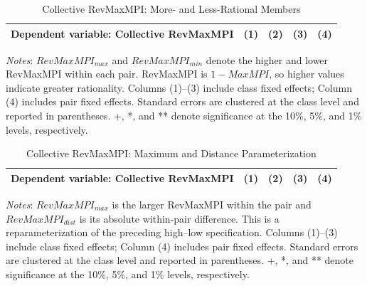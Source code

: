 \documentclass[11 pt]{article}
\begin{document}
\begin{table}[H]
\centering
\caption{Collective RevMaxMPI: More- and Less-Rational Members}
\label{tab:collective_maxmpi_highlow}
\begin{tabular}{lcccc}
\toprule \hline
Dependent variable: Collective RevMaxMPI & (1) & (2) & (3) & (4) \\
\midrule

\end{tabular}
\begin{minipage}{\textwidth}
{\footnotesize \emph{Notes}: $RevMaxMPI_{max}$ and $RevMaxMPI_{min}$ denote the higher and lower RevMaxMPI within each pair. RevMaxMPI is $1-MaxMPI$, so higher values indicate greater rationality. Columns (1)--(3) include class fixed effects; Column (4) includes pair fixed effects. Standard errors are clustered at the class level and reported in parentheses. +, *, and ** denote significance at the 10\%, 5\%, and 1\% levels, respectively.}
\end{minipage}
\end{table}

\begin{table}[H]
\centering
\caption{Collective RevMaxMPI: Maximum and Distance Parameterization}
\label{tab:collective_maxmpi_maxdist}
\begin{tabular}{lcccc}
\toprule \hline
Dependent variable: Collective RevMaxMPI & (1) & (2) & (3) & (4) \\
\midrule

\end{tabular}
\begin{minipage}{\textwidth}
{\footnotesize \emph{Notes}: $RevMaxMPI_{max}$ is the larger RevMaxMPI within the pair and $RevMaxMPI_{dist}$ is its absolute within-pair difference. This is a reparameterization of the preceding high--low specification. Columns (1)--(3) include class fixed effects; Column (4) includes pair fixed effects. Standard errors are clustered at the class level and reported in parentheses. +, *, and ** denote significance at the 10\%, 5\%, and 1\% levels, respectively.}
\end{minipage}
\end{table}
\end{document}
